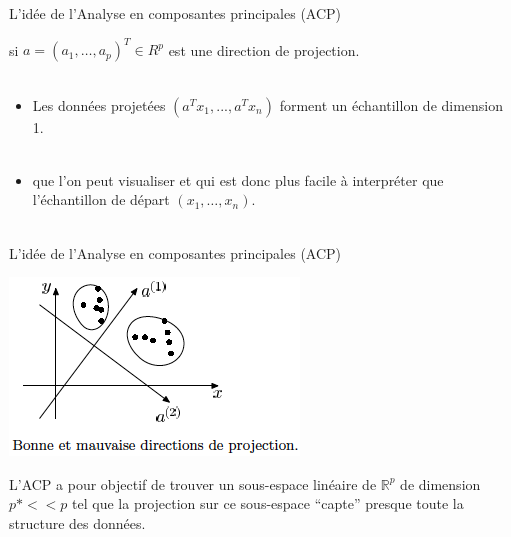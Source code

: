 \documentclass[10pt]{beamer}
\begin{document}
\begin{frame}{L’idée de l’Analyse en composantes principales (ACP)}


si $a = (a_1, \ldots ,a_p)^T \in R^p$ est une direction de projection.\\~\\

\begin{itemize}

\item Les données projetées $(a^T x_1, . . . ,a^T x_n)$ forment un échantillon de dimension 1.\\~\\

\item que l’on peut visualiser et qui est donc plus facile à interpréter que l’échantillon de départ $(x_1, \dots , x_n)$.\\~\\

\end{itemize}


\end{frame}

\begin{frame}{L’idée de l’Analyse en composantes principales (ACP)}

\centering

\includegraphics[scale=0.6]{ACP_ID.png} 

L’ACP a pour objectif de trouver un sous-espace linéaire de $\mathbb{R}^p$ de dimension $p* << p$ tel que la projection sur ce sous-espace “capte” presque toute la structure des données.


\end{frame}
\end{document}
